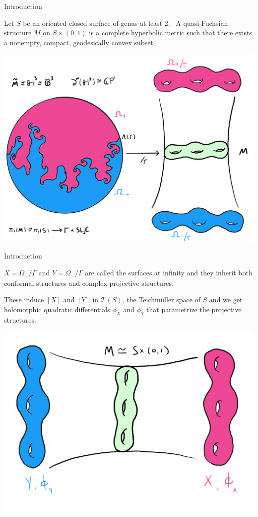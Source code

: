 \documentclass[professionalfont]{beamer}
\begin{document}




\begin{frame}{Introduction}

Let $S$ be an oriented closed surface of genus at least 2.  \ A quasi-Fuchsian structure $M$ on $S \times (0,1)$ is a complete hyperbolic metric such that there exists a nonempty, compact, geodesically convex subset.


\centering\includegraphics[scale=0.09]{QF-8.jpg}
	


\end{frame}




\begin{frame}{Introduction}
	
$X = \Omega_+/\Gamma$ and $Y = \Omega_-/\Gamma$ are called the surfaces at infinity and they inherit both conformal structures and complex projective structures. 
\newline

These induce $[X]$ and $[Y]$ in $\mathcal{T}(S)$, the Teichm\"uller space of $S$ and we get holomorphic quadratic differentials $\phi_X$ and $\phi_Y$ that parametrize the projective structures.

\centering\includegraphics[scale=0.1]{QF-sideways.jpg}


\end{frame}
\end{document}
